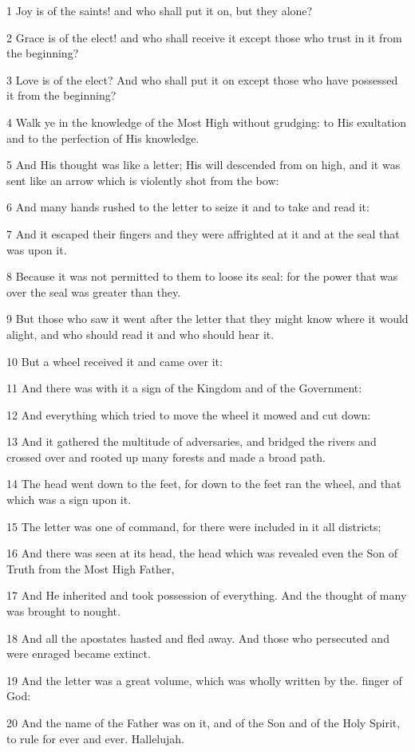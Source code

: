 \par 1 Joy is of the saints! and who shall put it on, but they alone?
\par 2 Grace is of the elect! and who shall receive it except those who trust in it from the beginning?
\par 3 Love is of the elect? And who shall put it on except those who have possessed it from the beginning?
\par 4 Walk ye in the knowledge of the Most High without grudging: to His exultation and to the perfection of His knowledge.
\par 5 And His thought was like a letter; His will descended from on high, and it was sent like an arrow which is violently shot from the bow:
\par 6 And many hands rushed to the letter to seize it and to take and read it:
\par 7 And it escaped their fingers and they were affrighted at it and at the seal that was upon it.
\par 8 Because it was not permitted to them to loose its seal: for the power that was over the seal was greater than they.
\par 9 But those who saw it went after the letter that they might know where it would alight, and who should read it and who should hear it.
\par 10 But a wheel received it and came over it:
\par 11 And there was with it a sign of the Kingdom and of the Government:
\par 12 And everything which tried to move the wheel it mowed and cut down:
\par 13 And it gathered the multitude of adversaries, and bridged the rivers and crossed over and rooted up many forests and made a broad path.
\par 14 The head went down to the feet, for down to the feet ran the wheel, and that which was a sign upon it.
\par 15 The letter was one of command, for there were included in it all districts;
\par 16 And there was seen at its head, the head which was revealed even the Son of Truth from the Most High Father,
\par 17 And He inherited and took possession of everything. And the thought of many was brought to nought.
\par 18 And all the apostates hasted and fled away. And those who persecuted and were enraged became extinct.
\par 19 And the letter was a great volume, which was wholly written by the. finger of God:
\par 20 And the name of the Father was on it, and of the Son and of the Holy Spirit, to rule for ever and ever. Hallelujah.

